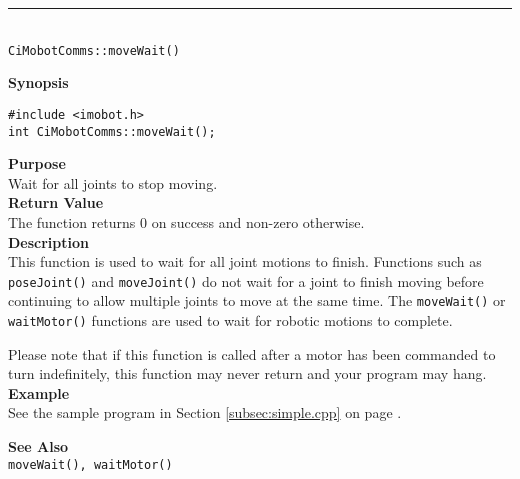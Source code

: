 \noindent
\vspace{5pt}
\rule{4.5in}{0.015in}\\
\noindent
{\LARGE \texttt{CiMobotComms::moveWait()}}\\
{}

\noindent
{\bf Synopsis}\\
\begin{verbatim}
#include <imobot.h>
int CiMobotComms::moveWait();
\end{verbatim}

\noindent
{\bf Purpose}\\
Wait for all joints to stop moving.\\

\noindent
{\bf Return Value}\\
The function returns 0 on success and non-zero otherwise.\\

\noindent
{\bf Description}\\
This function is used to wait for all joint motions to finish. Functions such as
\texttt{poseJoint()} and \texttt{moveJoint()} do not wait for a joint to finish
moving before continuing to allow multiple joints to move at the same time. The
\texttt{moveWait()} or \texttt{waitMotor()} functions are used to wait for
robotic motions to complete.

Please note that if this function is called after a motor has been commanded to
turn indefinitely, this function may never return and your program may hang.\\

\noindent
{\bf Example}\\
See the sample program in Section \ref{subsec:simple.cpp} on page \pageref{subsec:simple.cpp}.
\noindent

\noindent
{\bf See Also}\\
\texttt{moveWait(), waitMotor()}

